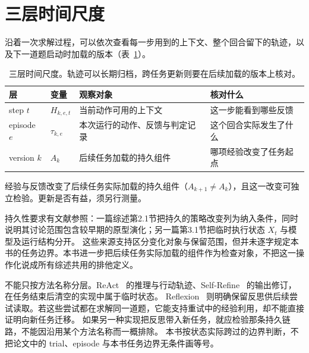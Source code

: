 \section{三层时间尺度}
\label{sec:timescale}

沿着一次求解过程，可以依次查看每一步用到的上下文、整个回合留下的轨迹，以及下一道题启动时加载的版本（表~\ref{tab:scale}）。

\begin{table}[htbp]
\centering
\begin{tabular}{@{}p{1.6cm}p{1.4cm}p{5.0cm}p{4.6cm}@{}}
\toprule
层 & 变量 & 观察对象 & 核对什么 \\
\midrule
step $t$ & $H_{k,e,t}$ & 当前动作可用的上下文 & 这一步能看到哪些反馈 \\
episode $e$ & $\tau_{k,e}$ & 本次运行的动作、反馈与判定记录 & 这个回合实际发生了什么 \\
version $k$ & $A_k$ & 后续任务加载的持久组件 & 哪项经验改变了任务起点 \\
\bottomrule
\end{tabular}
\caption{三层时间尺度。轨迹可以长期归档，跨任务更新则要在后续加载的版本上核对。}
\label{tab:scale}
\end{table}



\begin{samepage}
\begin{definition}[自进化判据]
经验与反馈改变了后续任务实际加载的持久组件（$A_{k+1}\neq A_k$），且这一改变可独立检验。更新是否有益，须另行测量。
\end{definition}
\end{samepage}

持久性要求有文献参照：一篇综述第2.1节把持久的策略改变列为纳入条件，同时说明其讨论范围包含较早期的原型演化\cite{self-evolving-survey-2507}；另一篇第3.1节把临时执行状态 $X_t$ 与模型及运行结构分开\cite{self-improvements-survey-2607}。
这些来源支持区分变化对象与保留范围，但并未逐字规定本书的任务边界。本书进一步把后续任务实际加载的组件作为检查对象，不把这一操作化说成所有综述共用的排他定义。

\begin{sloppypar}
不能只按方法名称分层。ReAct~\cite{react-2210} 的推理与行动轨迹、Self-Refine~\cite{self-refine-2303} 的输出修订，在任务结束后清空的实现中属于临时状态。
Reflexion~\cite{reflexion-2303} 则明确保留反思供后续尝试读取。若这些尝试都在求解同一道题，它能支持重试中的经验利用，却不能直接证明向新任务迁移。
如果另一种实现把反思带入新任务，就应检验那条持久链路，不能因沿用某个方法名称而一概排除。
本书按状态实际跨过的边界判断，不把论文中的 trial、episode 与本书任务边界无条件画等号。
\end{sloppypar}

